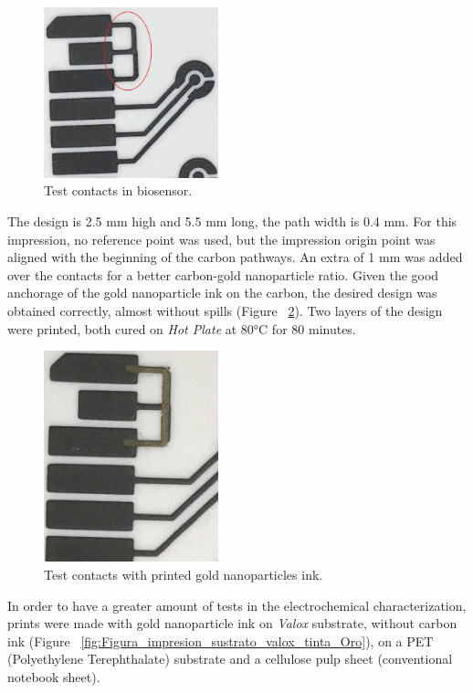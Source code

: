 \begin{figure}[H]
  \centering
    \includegraphics[width=0.45\textwidth]{Figures/Figura_contactos_prueba}
  \caption{Test contacts in biosensor.}
  \label{fig:Figura_contactos_prueba}
\end{figure}

The design is 2.5 mm high and 5.5 mm long, the path width is 0.4 mm. For this impression, no reference point was used, but the impression origin point was aligned with the beginning of the carbon pathways. An extra of 1 mm was added over the contacts for a better carbon-gold nanoparticle ratio. Given the good anchorage of the gold nanoparticle ink on the carbon, the desired design was obtained correctly, almost without spills (Figure ~\ref{fig:Figura_contactos_prueba_con_Oro}). Two layers of the design were printed, both cured on \textit{Hot Plate} at 80°C for 80 minutes.

\begin{figure}[H]
  \centering
    \includegraphics[width=0.45\textwidth]{Figures/Figura_contactos_prueba_con_Oro}
  \caption{Test contacts with printed gold nanoparticles ink.}
  \label{fig:Figura_contactos_prueba_con_Oro}
\end{figure}

In order to have a greater amount of tests in the electrochemical characterization, prints were made with gold nanoparticle ink on \textit{Valox} substrate, without carbon ink (Figure ~\ref{fig:Figura_impresion_sustrato_valox_tinta_Oro}), on a PET (Polyethylene Terephthalate) substrate and a cellulose pulp sheet (conventional notebook sheet).

